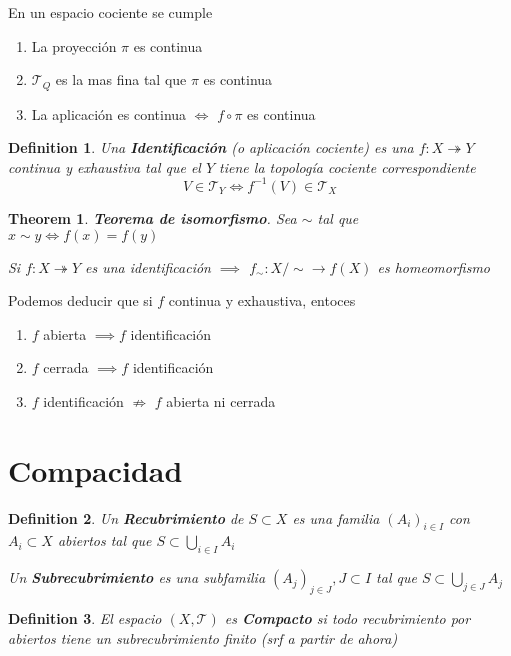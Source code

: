 \documentclass[leqno]{article}
\newtheorem*{definition}{Definition}
\newtheorem*{theorem}{Theorem}
\begin{document}
En un espacio cociente se cumple
\begin{enumerate}[topsep=-6pt, itemsep=0pt]
  \item La proyección $\pi$ es continua
  \item $\mathcal{T}_{Q}$ es la mas fina tal que $\pi$ es continua
  \item La aplicación es continua $\iff$ $f\circ \pi$ es continua
\end{enumerate}

\begin{definition}
Una \textbf{Identificación} (o aplicación cociente) es una $f:X \twoheadrightarrow Y$ continua y exhaustiva tal que el $Y$ tiene la topología cociente correspondiente
\[
V\in \mathcal{T}_Y \iff f^{-1}(V) \in \mathcal{T}_X
\] 
\end{definition}

\begin{theorem}
\textbf{Teorema de isomorfismo}. Sea $\sim $ tal que $x\sim y \iff f(x)=f(y)$

Si $f:X \twoheadrightarrow Y$ es una identificación $\implies$ $f_\sim :X / \sim \to  f(X)$ es homeomorfismo
\end{theorem}

Podemos deducir que si $f$ continua y exhaustiva, entoces
\begin{enumerate}[topsep=-6pt, itemsep=0pt]
  \item $f$ abierta $\implies f$ identificación
  \item $f$ cerrada $\implies f$ identificación
  \item $f$ identificación  $\not\Rightarrow$ $f$ abierta ni cerrada
\end{enumerate}

\section{Compacidad}
\begin{definition}
Un \textbf{Recubrimiento} de $S\subset X$ es una familia $(A_i)_{i\in I}$ con $A_i \subset X$ abiertos tal que $S\subset \bigcup_{i\in I} A_i$ 

Un \textbf{Subrecubrimiento} es una subfamilia $(A_j)_{j\in J}, J\subset I$ tal que $S\subset \bigcup_{j\in J} A_j$ 
\end{definition}

\begin{definition}
El espacio $(X, \mathcal{T})$ es \textbf{Compacto} si todo recubrimiento por abiertos tiene un subrecubrimiento finito (srf a partir de ahora)
\end{definition}
\end{document}
